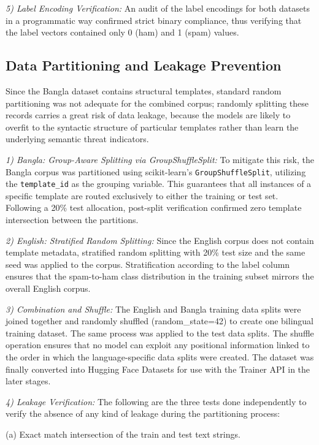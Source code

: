 \documentclass[journal]{IEEEtran}
\begin{document}
\textit{5) Label Encoding Verification:} An audit of the label encodings for both datasets in a programmatic way confirmed strict binary compliance, thus verifying that the label vectors contained only 0 (ham) and 1 (spam) values.

\subsection{Data Partitioning and Leakage Prevention}

Since the Bangla dataset contains structural templates, standard random partitioning was not adequate for the combined corpus; randomly splitting these records carries a great risk of data leakage, because the models are likely to overfit to the syntactic structure of particular templates rather than learn the underlying semantic threat indicators.

\textit{1) Bangla: Group-Aware Splitting via GroupShuffleSplit:} To mitigate this risk, the Bangla corpus was partitioned using scikit-learn's \texttt{GroupShuffleSplit}, utilizing the \texttt{template\_id} as the grouping variable. This guarantees that all instances of a specific template are routed exclusively to either the training or test set. Following a 20\% test allocation, post-split verification confirmed zero template intersection between the partitions.

\textit{2) English: Stratified Random Splitting:} Since the English corpus
does not contain template metadata, stratified random splitting with 20\%
test size and the same seed was applied to the corpus. Stratification
according to the label column ensures that the spam-to-ham class distribution in the training subset mirrors the overall English corpus.

\textit{3) Combination and Shuffle:} The English and Bangla training data
splits were joined together and randomly shuffled (random\_state=42) to
create one bilingual training dataset. The same process was applied to
the test data splits. The shuffle operation ensures that no model can
exploit any positional information linked to the order in
which the language-specific data splits were created. The dataset was
finally converted into Hugging Face Datasets for use with the Trainer
API in the later stages.

\textit{4) Leakage Verification:} The following are the three tests done
independently to verify the absence of any kind of leakage during the
partitioning process:

(a) Exact match intersection of the train and test text strings.
\end{document}
